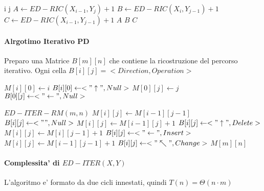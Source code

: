 \begin{algorithm}
    \begin{algorithmic}
                \State \Return i
                \State \Return j
            \Else
                \State $A \gets ED-RIC(X_{i-1}, Y_{j}) + 1$
                \State $B \gets ED-RIC(X_{i}, Y_{j-1}) + 1$
                \State $C \gets ED-RIC(X_{i-1}, Y_{j-1}) + 1$
                    \State \Return $A$
                    \State \Return $B$
                \Else
                    \State \Return $C$
                \EndIf
            \EndIf
        \EndProcedure
    \end{algorithmic}
\end{algorithm}

\paragraph{Alrgotimo Iterativo PD}

Preparo una Matrice $B[m][n]$ che contiene la ricostruzione del percorso iterativo.
Ogni cella $B[i][j] = <Direction, Operation>$

\begin{algorithm}
    \begin{algorithmic}
                \State $M[i][0] \gets i$
                \State $B[i][0] \gets <"\uparrow", Null>$
            \EndFor
                \State $M[0][j] \gets j$
                \State $B[0][j] \gets <"\leftarrow", Null>$
            \EndFor
        \EndProcedure
    \end{algorithmic}
\end{algorithm}


\begin{algorithm}
    \begin{algorithmic}
            \State $ED-ITER-RM(m, n)$
                        \State $M[i][j] \gets M[i-1][j-1]$
                        \State $B[i][j] \gets <"", Null>$
                    \End
                        \State $M[i][j] \gets M[i-1][j] + 1$
                        \State $B[i][j] \gets <"\uparrow", Delete>$
                        \State $M[i][j] \gets M[i][j-1] + 1$
                        \State $B[i][j] \gets <"\leftarrow", Insert>$
                    \Else
                        \State $M[i][j] \gets M[i-1][j-1] + 1$
                        \State $B[i][j] \gets <"\nwarrow", Change>$
                    \EndIF
                \EndFor
            \EndFor
            \State \Return $M[m][n]$
        \EndProcedure
    \end{algorithmic}
\end{algorithm}

\paragraph{Complessita' di $ED-ITER(X, Y)$}

L'algoritmo e' formato da due cicli innestati, quindi $T(n) = \Theta(n \cdot m)$

